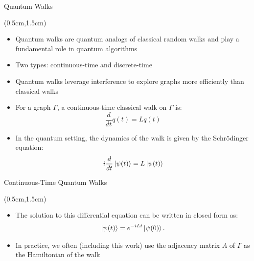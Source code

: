\documentclass{beamer}
\theoremstyle{definition}
\begin{document}
\begin{frame}{Quantum Walks}
    
    \begin{textblock*}{12cm}(0.5cm,1.5cm)

        \begin{itemize}
            \item Quantum walks are quantum analogs of classical random walks and play
            a fundamental role in quantum algorithms
            \item  Two types: continuous-time and discrete-time
            \item Quantum walks leverage interference to explore graphs more efficiently than classical walks
            \item For a graph $\Gamma$, a continuous-time classical walk on $\Gamma$ is:
            \[
            \frac{d}{dt} q(t) = Lq(t)
            \]
            \item In the quantum setting,  the dynamics of the walk is given by the Schr\"{o}dinger equation:
            \[
                i\frac{d}{dt}\ket{\psi(t)} = L\ket{\psi(t)}
            \]
            
        \end{itemize}
            
    \end{textblock*}
\end{frame}




\begin{frame}{Continuous-Time Quantum Walks}
    
    \begin{textblock*}{12cm}(0.5cm,1.5cm)

        \begin{itemize}
            \item The solution to this differential
            equation can be written in closed form as:
            \[
                \ket{\psi(t)} = e^{-iLt} \ket{\psi(0)}.
            \]
            \item In practice, we often (including this work) use the adjacency matrix $A$ of $\Gamma$ as the Hamiltonian of the walk
            
        \end{itemize}
            
    \end{textblock*}
\end{frame}
\end{document}
